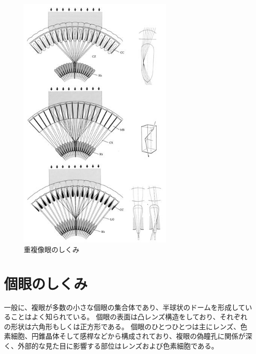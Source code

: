 \begin{figure}[hn]
  \centering
  \includegraphics[width=3.0in]{./img/tyoufukuzougan.jpg}
  \caption{重複像眼のしくみ}
  \label{F}
\end{figure}


\section{個眼のしくみ}

一般に、複眼が多数の小さな個眼の集合体であり、半球状のドームを形成していることはよく知られている。
個眼の表面は凸レンズ構造をしており、それぞれの形状は六角形もしくは正方形である\figref{}。
個眼のひとつひとつは主にレンズ、色素細胞、円錐晶体そして感桿などから構成されており、複眼の偽瞳孔に関係が深く、外部的な見た目に影響する部位はレンズおよび色素細胞である。




